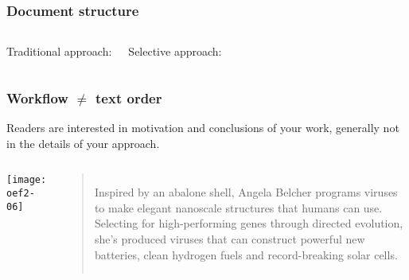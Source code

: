 \documentclass[aspectratio=169]{beamer}
\begin{document}
\begin{frame}[plain]
  \frametitle{Document structure}
  
  \begin{columns}
    \begin{center}
      Traditional approach:
      
    \end{center}
    \begin{center}
      Selective approach:
      
    \end{center}
  \end{columns}
\end{frame}

\begin{frame}
  \frametitle{Workflow $\ne$ text order}
  
  Readers are interested in motivation and conclusions of your work, generally not in the details of your approach.
  
  \vfill
  
  \begin{columns}
    \texttt{[image: oef2-06]}
    
    \begin{quotation}
      Inspired by an abalone shell, Angela Belcher programs viruses to make elegant nanoscale structures that humans can use. Selecting for high-performing genes through directed evolution, she’s produced viruses that can construct powerful new batteries, clean hydrogen fuels and record-breaking solar cells.
    \end{quotation}
  \end{columns}
\end{frame}
\end{document}
